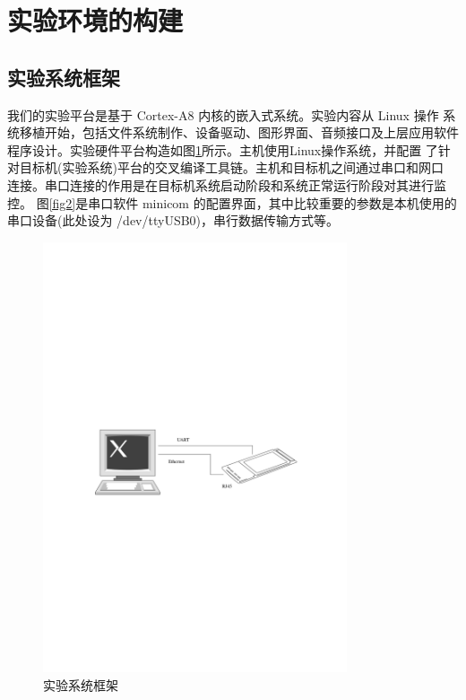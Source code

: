 \documentclass[nofonts]{ctexart}
\begin{document}
\section{实验环境的构建}

\subsection{实验系统框架}

    我们的实验平台是基于 Cortex-A8 内核的嵌入式系统。实验内容从 Linux 操作
系统移植开始，包括文件系统制作、设备驱动、图形界面、音频接口及上层应用软件
程序设计。实验硬件平台构造如图\ref{fig1}所示。主机使用Linux操作系统，并配置
了针对目标机(实验系统)平台的交叉编译工具链。主机和目标机之间通过串口和网口
连接。串口连接的作用是在目标机系统启动阶段和系统正常运行阶段对其进行监控。
图\ref{fig2}是串口软件 minicom 的配置界面，其中比较重要的参数是本机使用的
串口设备(此处设为 /dev/ttyUSB0)，串行数据传输方式等。

\begin{figure}
\centering
\includegraphics[width=0.8\textwidth]{old_system}
\caption{实验系统框架}\label{fig1}
\end{figure}
\end{document}
